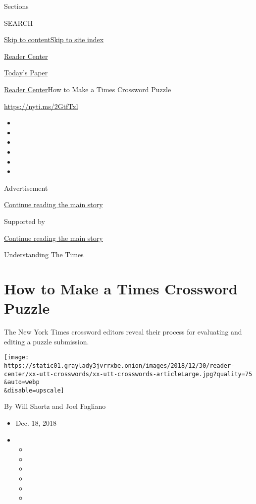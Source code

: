 Sections

SEARCH

\protect\hyperlink{site-content}{Skip to
content}\protect\hyperlink{site-index}{Skip to site index}

\href{https://www.nytimes3xbfgragh.onion/section/reader-center}{Reader
Center}

\href{https://myaccount.nytimes3xbfgragh.onion/auth/login?response_type=cookie\&client_id=vi}{}

\href{https://www.nytimes3xbfgragh.onion/section/todayspaper}{Today's
Paper}

\href{/section/reader-center}{Reader Center}\textbar{}How to Make a
Times Crossword Puzzle

\url{https://nyti.ms/2GtfTxl}

\begin{itemize}
\item
\item
\item
\item
\item
\item
\end{itemize}

Advertisement

\protect\hyperlink{after-top}{Continue reading the main story}

Supported by

\protect\hyperlink{after-sponsor}{Continue reading the main story}

Understanding The Times

\hypertarget{how-to-make-a-times-crossword-puzzle}{%
\section{How to Make a Times Crossword
Puzzle}\label{how-to-make-a-times-crossword-puzzle}}

The New York Times crossword editors reveal their process for evaluating
and editing a puzzle submission.

\texttt{[image: https://static01.graylady3jvrrxbe.onion/images/2018/12/30/reader-center/xx-utt-crosswords/xx-utt-crosswords-articleLarge.jpg?quality=75\\\&auto=webp\\\&disable=upscale]}

By Will Shortz and Joel Fagliano

\begin{itemize}
\item
  Dec. 18, 2018
\item
  \begin{itemize}
  \item
  \item
  \item
  \item
  \item
  \item
  \end{itemize}
\end{itemize}

